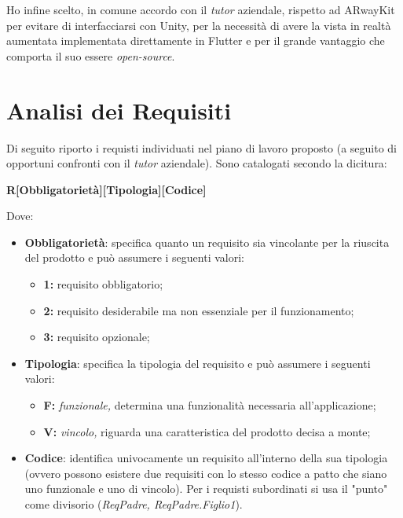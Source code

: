 Ho infine scelto, in comune accordo con il \textit{tutor} aziendale, \aplug{} rispetto ad ARwayKit per evitare di interfacciarsi con Unity, per la necessità di avere la vista in realtà aumentata implementata direttamente in Flutter e per il grande vantaggio che comporta il suo essere \textit{open-source}.

\section{Analisi dei Requisiti}
\label{sec:analisi_requisiti}
Di seguito riporto i requisti individuati nel piano di lavoro proposto (a seguito di opportuni confronti con il \textit{tutor} aziendale). Sono catalogati secondo la dicitura:
\begin{center}
    \textbf{R[Obbligatorietà][Tipologia][Codice]}
\end{center}
Dove:
\begin{itemize}
    \item \textbf{Obbligatorietà}: specifica quanto un requisito sia vincolante per la riuscita del prodotto e può assumere i seguenti valori:
    \begin{itemize}
        \item \textbf{1: } requisito obbligatorio;
        \item \textbf{2: } requisito desiderabile ma non essenziale per il funzionamento;
        \item \textbf{3: } requisito opzionale;
    \end{itemize}
    \item \textbf{Tipologia}: specifica la tipologia del requisito e può assumere i seguenti valori:
    \begin{itemize}
        \item \textbf{F: }\textit{funzionale,} determina una funzionalità necessaria all'applicazione;
        \item \textbf{V: }\textit{vincolo,} riguarda una caratteristica del prodotto decisa a monte;
    \end{itemize}
    \item \textbf{Codice}: identifica univocamente un requisito all'interno della sua tipologia (ovvero possono esistere due requisiti con lo stesso codice a patto che siano uno funzionale e uno di vincolo). Per i requisti subordinati si usa il "punto" come divisorio (\textit{ReqPadre, ReqPadre.Figlio1}).
\end{itemize}

